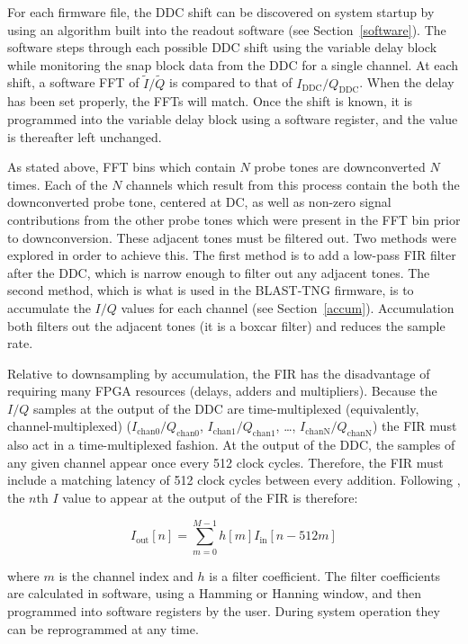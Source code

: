 For each firmware file, the DDC shift can be discovered on system startup by using an algorithm built into the readout software (see Section~\ref{software}). The software steps through each possible DDC shift using the variable delay block while monitoring the snap block data from the DDC for a single channel. At each shift, a software FFT of $\widetilde{I}/\widetilde{Q}$ is compared to that of $I_{\mathrm{DDC}}/Q_{\mathrm{DDC}}$. When the delay has been set properly, the FFTs will match. Once the shift is known, it is programmed into the variable delay block using a software register, and the value is thereafter left unchanged.

As stated above, FFT bins which contain $N$ probe tones are downconverted $N$ times. Each of the $N$ channels which result from this process contain the both the downconverted probe tone, centered at DC, as well as non-zero signal contributions from the other probe tones which were present in the FFT bin prior to downconversion. These adjacent tones must be filtered out. Two methods were explored in order to achieve this. The first method is to add a low-pass FIR filter after the DDC, which is narrow enough to filter out any adjacent tones. The second method, which is what is used in the BLAST-TNG firmware, is to accumulate the $I/Q$ values for each channel (see Section~\ref{accum}). Accumulation both filters out the adjacent tones (it is a boxcar filter) and reduces the sample rate.

Relative to downsampling by accumulation, the FIR has the disadvantage of requiring many FPGA resources (delays, adders and multipliers). Because the $I/Q$ samples at the output of the DDC are time-multiplexed (equivalently, channel-multiplexed) ($I_{\mathrm{chan0}}/Q_{\mathrm{chan0}}$, $I_{\mathrm{chan1}}/Q_{\mathrm{chan1}}$, \ldots, $I_{\mathrm{chanN}}/Q_{\mathrm{chanN}}$) the FIR must also act in a time-multiplexed fashion. At the output of the DDC, the samples of any given channel appear once every 512 clock cycles. Therefore, the FIR must include a matching latency of 512 clock cycles between every addition. Following \citet{strader2016digitial}, the $n$th $I$ value to appear at the output of the FIR is therefore:

\begin{equation}
  I_{\mathrm{out}}[n] = \sum _{m=0}^{M - 1} h[m]I_{\mathrm{in}}[n - 512m]
\end{equation}

where $m$ is the channel index and $h$ is a filter coefficient. The filter coefficients are calculated in software, using a Hamming or Hanning window, and then programmed into software registers by the user. During system operation they can be reprogrammed at any time.

